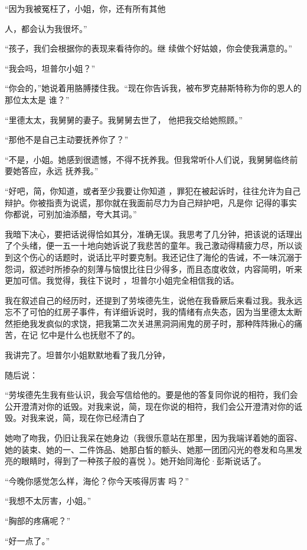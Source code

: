 \documentclass{article}
\begin{document}
“因为我被冤枉了，小姐，你，还有所有其他
\newpage

人，都会认为我很坏。” 

“孩子，我们会根据你的表现来看待你的。继
续做个好姑娘，你会使我满意的。” 


“我会吗，坦普尔小姐？” 

“你会的，”她说着用胳膊搂住我。“现在你告诉我，被布罗克赫斯特称为你的恩人的那位太太是
谁？” 

“里德太太，我舅舅的妻子。我舅舅去世了，
他把我交给她照顾。” 


“那他不是自己主动要抚养你了？” 

“不是，小姐。她感到很遗憾，不得不抚养我。但我常听仆人们说，我舅舅临终前要她答应，永远
抚养我。” 

“好吧，简，你知道，或者至少我要让你知道
\newpage
，罪犯在被起诉时，往往允许为自己辩护。你被指责为说谎，那你就在我面前尽力为自己辩护吧，凡是你
记得的事实你都说，可别加油添醋，夸大其词。” 

我暗下决心，要把话说得恰如其分，准确无误。我思考了几分钟，把该说的话理出了个头绪，便一五一十地向她诉说了我悲苦的童年。我己激动得精疲力尽，所以谈到这个伤心的话题时，说话比平时要克制。我还记住了海伦的告诫，不一味沉溺于怨词，叙述时所掺杂的刻薄与恼恨比往日少得多，而且态度收敛，内容简明，听来更加可信。我觉得，我往下说时
，坦普尔小姐完全相信我的话。 

我在叙述自己的经历时，还提到了劳埃德先生，说他在我昏厥后来看过我。我永远忘不了可怕的红房子事件，有详细诉说时，我的情绪有点失态，因为当里德太太断然拒绝我发疯似的求饶，把我第二次关进黑洞洞闹鬼的房子时，那种阵阵揪心的痛苦，在记
忆中是什么也抚慰不了的。 

我讲完了。坦普尔小姐默默地看了我几分钟，
\newpage

随后说： 

“劳埃德先生我有些认识，我会写信给他的。要是他的答复同你说的相符，我们会公开澄清对你的诋毁。对我来说，简，现在你说的相符，我们会公开澄清对你的诋毁。对我来说，简，现在你已经清白了

她吻了吻我，仍旧让我呆在她身边（我很乐意站在那里，因为我端详着她的面容、她的装束、她的一、二件饰品、她那白皙的额头、她那一团团闪光的卷发和乌黑发亮的眼睛时，得到了一种孩子般的喜悦
）。她开始同海伦·彭斯说话了。 

“今晚你感觉怎么样，海伦？你今天咳得厉害
吗？” 


“我想不太厉害，小姐。” 


“胸部的疼痛呢？” 


\newpage

“好一点了。” 
\end{document}
